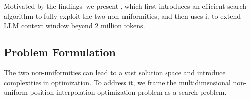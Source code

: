\documentclass{article}
\theoremstyle{plain}
\theoremstyle{definition}
\theoremstyle{remark}
\begin{document}
\section{{\sysname}}
\vspace{-1ex}
\label{sec:method}
Motivated by the findings, we present {\sysname}, which first introduces an efficient search algorithm to fully exploit the two non-uniformities, and then uses it to extend LLM context window beyond 2 million tokens. 


\vspace{-1ex}
\subsection{Problem Formulation}
\vspace{-1ex}
The two non-uniformities can lead to a vast solution space and introduce complexities in optimization. To address it,  we frame the multidimensional non-uniform position interpolation optimization problem as a  search problem.
\end{document}
